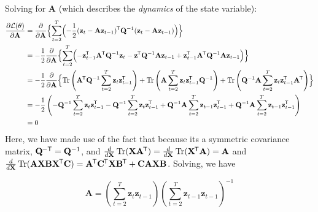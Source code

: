 \documentclass[11pt]{article}
\DeclareMathOperator{\Tr}{Tr}
\newcommand{\zb}{\mathbf{z}}
\newcommand{\Ab}{\mathbf{A}}
\newcommand{\Qb}{\mathbf{Q}}
\newcommand{\Cb}{\mathbf{C}}
\newcommand*{\tran}{^{\mkern-1.5mu\mathsf{T}}}
\newcommand*{\invtran}{^{\mkern-1.5mu\mathsf{-T}}}
\begin{document}
Solving for $\Ab$ (which describes the \textit{dynamics} of the state variable):
\begin{align*}
  \frac{\partial \mathcal{L}(\theta)}{\partial \Ab} &=
    \frac{\partial}{\partial \Ab} \Bigl\lbrace \sum_{t=2}^T \Bigl(
     -\frac{1}{2} (\zb_t - \Ab\zb_{t-1})\tran \Qb^{-1} (\zb_t - \Ab\zb_{t-1})
     \Bigr)\Bigr\rbrace \\
  &= -\frac{1}{2} \frac{\partial}{\partial \Ab} \Bigl\lbrace \sum_{t=2}^T \Bigl(
    -\zb_{t-1}\tran\Ab\tran \Qb^{-1} \zb_t
    -\zb\tran \Qb^{-1} \Ab\zb_{t-1}
    +\zb_{t-1}\tran\Ab\tran \Qb^{-1}\Ab\zb_{t-1} \Bigr)\Bigr\rbrace \\
  &= -\frac{1}{2} \frac{\partial}{\partial \Ab} \Bigl\lbrace
    \Tr\left(\Ab\tran \Qb^{-1} \sum_{t=2}^T \zb_t \zb_{t-1}\tran \right)
    +\Tr\left(\Ab \sum_{t=2}^T \zb_t \zb_{t-1}\tran \Qb^{-1} \right)
    +\Tr\left(\Qb^{-1} \Ab \sum_{t=2}^T \zb_t \zb_{t-1}\tran \Ab\tran \right)
    \Bigr\rbrace \\
  &= -\frac{1}{2} \left(-\Qb^{-1} \sum_{t=2}^T \zb_t \zb_{t-1}\tran
    -\Qb^{-1} \sum_{t=2}^T \zb_t \zb_{t-1}\tran
    +\Qb^{-1} \Ab \sum_{t=2}^T \zb_{t-1} \zb_{t-1}\tran
    +\Qb^{-1} \Ab \sum_{t=2}^T \zb_{t-1} \zb_{t-1}\tran \right) \\
  &= 0
\end{align*}
Here, we have made use of the fact that because its a symmetric covariance
matrix, $\Qb\invtran = \Qb^{-1}$, and $\frac{d}{d \mathbf{X}}
\Tr(\mathbf{X} \Ab \tran) = \frac{d}{d \mathbf{X}}
\Tr(\mathbf{X}\tran \Ab) = \Ab$ and $\frac{d}{d \mathbf{X}}
\Tr(\Ab \mathbf{X} \mathbf{B} \mathbf{X}\tran \Cb) =
\Ab\tran\Cb\tran\mathbf{X}\mathbf{B}\tran +
\Cb \Ab \mathbf{X} \mathbf{B}$. Solving, we have
\begin{framed}
  \begin{equation}
    \Ab = \left(\sum_{t=2}^T \zb_t \zb_{t-1} \right)
        \left(\sum_{t=2}^T \zb_{t-1} \zb_{t-1} \right)^{-1}
    \label{eqn:dynamicsSoln}
  \end{equation}
\end{framed}
\end{document}
